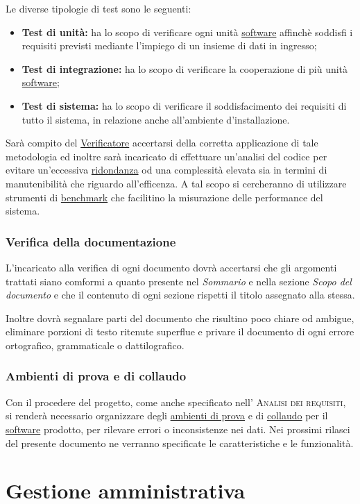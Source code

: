\documentclass[11pt,a4paper]{article}
\begin{document}
Le diverse tipologie di test sono le seguenti:
\begin{itemize}
	\item \textbf{Test di unità:} ha lo scopo di verificare ogni unità \underline{software} affinchè soddisfi i requisiti previsti mediante l’impiego di un insieme di dati in ingresso;
	\item \textbf{Test di integrazione:} ha lo scopo di verificare la cooperazione di più unità \underline{software};
	\item \textbf{Test di sistema:} ha lo scopo di verificare il soddisfacimento dei requisiti di tutto il sistema, in relazione anche all'ambiente d'installazione.
\end{itemize}
Sarà compito del \underline{Verificatore} accertarsi della corretta applicazione di tale metodologia ed inoltre sarà incaricato di effettuare un'analisi del codice per evitare un'eccessiva \underline{ridondanza} od una complessità elevata sia in termini di manutenibilità che riguardo all'efficenza. A tal scopo si cercheranno di utilizzare strumenti di \underline{benchmark} che facilitino la misurazione delle performance del sistema.
\subsubsection{Verifica della documentazione}
L'incaricato alla verifica di ogni documento dovrà accertarsi che gli argomenti trattati siano comformi a quanto presente nel \textit{Sommario} e nella sezione \textit{Scopo del documento} e che il contenuto di ogni sezione rispetti il titolo assegnato alla stessa.

Inoltre dovrà segnalare parti del documento che risultino poco chiare od ambigue, eliminare porzioni di testo ritenute superflue e privare il documento di ogni errore ortografico, grammaticale o dattilografico. 
\subsubsection{Ambienti di prova e di collaudo}
Con il procedere del progetto, come anche specificato nell' \textsc{Analisi dei requisiti}, si renderà necessario organizzare degli \underline{ambienti di prova} e di \underline{collaudo} per il \underline{software} prodotto, per rilevare errori o inconsistenze nei dati. Nei prossimi rilasci del presente documento ne verranno specificate le caratteristiche e le funzionalità.
\section{Gestione amministrativa}
\end{document}

